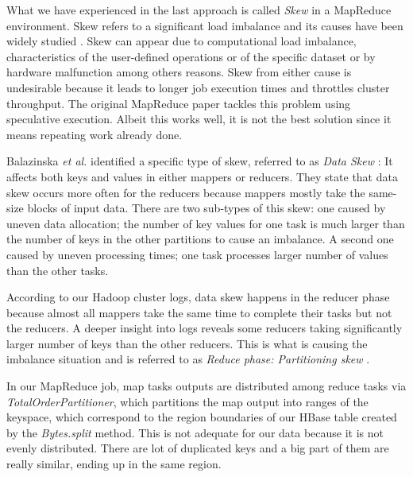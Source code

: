 What we have experienced in the last approach is called \textit{Skew} in a MapReduce environment. Skew refers to a significant load imbalance and its causes have been widely studied \cite{ananthanarayanan2010reining} \cite{dean2008mapreduce} \cite{walton1991taxonomy}. Skew can appear due to computational load imbalance, characteristics of the user-defined operations or of the specific dataset or by hardware malfunction among others reasons. Skew from either cause is undesirable because it leads to longer job execution times and throttles cluster throughput. The original MapReduce paper \cite{dean2008mapreduce} tackles this problem using speculative execution. Albeit this works well, it is not the best solution since it means repeating work already done.
\par
Balazinska \textit{et al.} identified a specific type of skew, referred to as \textit{Data Skew} \cite{kwon2013managing}: It affects both keys and values in either mappers or reducers. They state that data skew occurs more often for the reducers because mappers mostly take the same-size blocks of input data. There are two sub-types of this skew: one caused by uneven data allocation; the number of key values for one task is much larger than the number of keys in the other partitions to cause an imbalance. A second one caused by uneven processing times; one task processes larger number of values than the other tasks. 
\par
According to our Hadoop cluster logs, data skew happens in the reducer phase because almost all mappers take the same time to complete their tasks but not the reducers. A deeper insight into logs reveals some reducers taking significantly larger number of keys than the other reducers. This is what is causing the imbalance situation and is referred to as \textit{Reduce phase: Partitioning skew} \cite{kwon2012skewtune}.
\par
In our MapReduce job, map tasks outputs are distributed among reduce tasks via \textit{TotalOrderPartitioner}, which partitions the map output into ranges of the keyspace, which correspond to the region boundaries of our HBase table created by the \textit{Bytes.split} method. This is not adequate for our data because it is not evenly distributed. There are lot of duplicated keys and a big part of them are really similar, ending up in the same region.
\par
